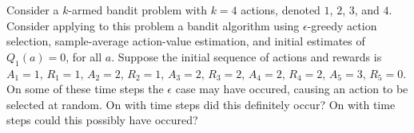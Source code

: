 
\begin{exercise}

Consider a $k$-armed bandit problem with $k = 4$ actions, denoted $1$, $2$, $3$, and $4$.
Consider applying to this problem a bandit algorithm using $\epsilon$-greedy action selection, sample-average action-value estimation, and initial estimates of $Q_1(a) = 0$, for all $a$.
Suppose the initial sequence of actions and rewards is $A_1 = 1$, $R_1 = 1$, $A_2 = 2$, $R_2 = 1$, $A_3 = 2$, $R_3 = 2$, $A_4 = 2$, $R_4 = 2$, $A_5 = 3$, $R_5 = 0$.
On some of these time steps the $\epsilon$ case may have occured, causing an action to be selected at random.
On with time steps did this definitely occur?
On with time steps could this possibly have occured?

\end{exercise}


